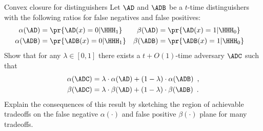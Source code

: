 \documentclass{crypto-exercise}
\author{Sven Laur}
\begin{document}
\begin{exercise}{Convex closure for distinguishers}
Let $\AD$ and $\ADB$ be a $t$-time distinguishers with the following ratios for false negatives and false positives:
\begin{align*}
&\begin{aligned}
\alpha(\AD) &= \pr{\AD(x) = 0|\HHH_1}\\
\alpha(\ADB) &= \pr{\ADB(x) = 0|\HHH_1}
\end{aligned} &
&\begin{aligned}
\beta(\AD) &= \pr{\AD(x) = 1 | \HHH_0}\\
\beta(\ADB) &= \pr{\ADB(x) = 1 | \HHH_0}
\end{aligned}
\end{align*}
Show that for any $\lambda\in[0,1]$ there exists a $t + O(1)$-time adversary $\ADC$ such that
\begin{align*}
\alpha(\ADC) &= \lambda \cdot \alpha(\AD) + (1-\lambda)\cdot\alpha(\ADB)\enspace,\\
\beta(\ADC)  &= \lambda \cdot \beta(\AD) + (1-\lambda)\cdot\beta(\ADB)\enspace.
\end{align*}
Explain the consequences of this result by sketching the region of achievable tradeoffs on the false negative $\alpha(\cdot)$ and false positive $\beta(\cdot)$ plane for many tradeoffs.  
\end{exercise}
\end{document}
